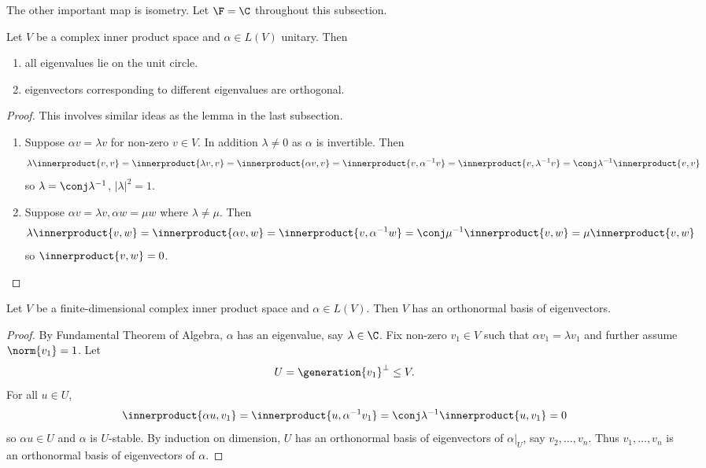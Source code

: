 \documentclass[a4paper]{article}
\newcommand*{\spans}{\generation}
\newcommand*{\ip}{\innerproduct}
\theoremstyle{definition}
\begin{document}
The other important map is isometry. Let \(\F = \C\) throughout this subsection.

\begin{lemma}
  Let \(V\) be a complex inner product space and \(\alpha \in L(V)\) unitary. Then
  \begin{enumerate}
  \item all eigenvalues lie on the unit circle.
  \item eigenvectors corresponding to different eigenvalues are orthogonal.
  \end{enumerate}
\end{lemma}

\begin{proof}
  This involves similar ideas as the lemma in the last subsection.
  \begin{enumerate}
  \item Suppose \(\alpha v = \lambda v\) for non-zero \(v \in V\). In addition \(\lambda \neq 0\) as \(\alpha\) is invertible. Then
    \[
      \lambda \ip{v, v} = \ip{\lambda v, v} = \ip{\alpha v, v} = \ip{v, \alpha^{-1} v} = \ip{v, \lambda^{-1} v} = \conj \lambda^{-1} \ip{v, v}
    \]
    so \(\lambda = \conj \lambda^{-1}\), \(|\lambda|^2 = 1\).
  \item Suppose \(\alpha v = \lambda v, \alpha w = \mu w\) where \(\lambda \neq \mu\). Then
    \[
      \lambda \ip{v, w} = \ip{\alpha v, w} = \ip{v, \alpha^{-1} w} = \conj \mu^{-1} \ip{v, w} = \mu \ip{v, w}
    \]
    so \(\ip{v, w} = 0\).
  \end{enumerate}
\end{proof}

\begin{theorem}
  Let \(V\) be a finite-dimensional complex inner product space and \(\alpha \in L(V)\). Then \(V\) has an orthonormal basis of eigenvectors.
\end{theorem}

\begin{proof}
  By Fundamental Theorem of Algebra, \(\alpha\) has an eigenvalue, say \(\lambda \in \C\). Fix non-zero \(v_1 \in V\) such that \(\alpha v_1 = \lambda v_1\) and further assume \(\norm{v_1} = 1\). Let
  \[
    U = \spans{v_1}^\perp \leq V.
  \]
  For all \(u \in U\),
  \[
    \ip{\alpha u, v_1} = \ip{u, \alpha^{-1} v_1} = \conj \lambda^{-1} \ip{u, v_1} = 0
  \]
  so \(\alpha u \in U\) and \(\alpha\) is \(U\)-stable. By induction on dimension, \(U\) has an orthonormal basis of eigenvectors of \(\alpha|_U\), say \(v_2, \dots, v_n\). Thus \(v_1, \dots, v_n\) is an orthonormal basis of eigenvectors of \(\alpha\).
\end{proof}
\end{document}
